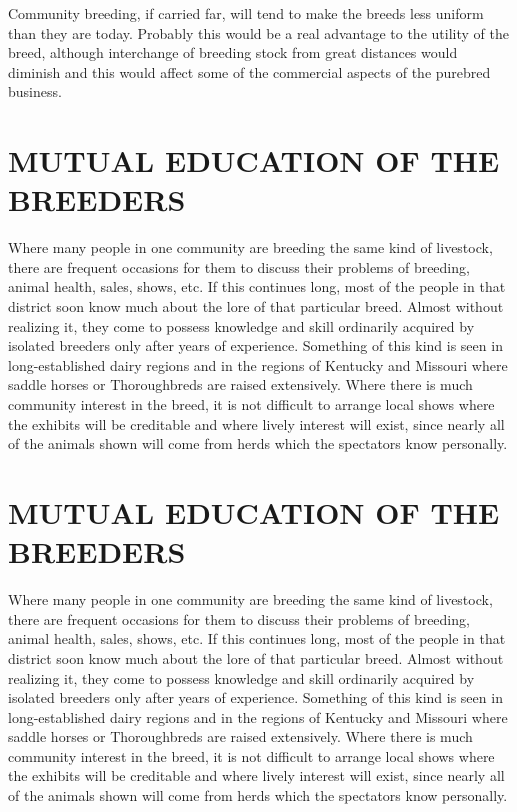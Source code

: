 Community breeding, if carried far, will tend to make the breeds
less uniform than they are today. Probably this would be a real advantage
to the utility of the breed, although interchange of breeding stock
from great distances would diminish and this would affect some of the
commercial aspects of the purebred business.

\section*{MUTUAL EDUCATION OF THE BREEDERS}
Where many people in one community are breeding the same kind
of livestock, there are frequent occasions for them to discuss their problems
of breeding, animal health, sales, shows, etc. If this continues long,
most of the people in that district soon know much about the lore of
that particular breed. Almost without realizing it, they come to possess
knowledge and skill ordinarily acquired by isolated breeders only after
years of experience. Something of this kind is seen in long-established
dairy regions and in the regions of Kentucky and Missouri where saddle
horses or Thoroughbreds are raised extensively. Where there is
much community interest in the breed, it is not difficult to arrange local
shows where the exhibits will be creditable and where lively interest
will exist, since nearly all of the animals shown will come from herds
which the spectators know personally.

\section*{MUTUAL EDUCATION OF THE BREEDERS}
Where many people in one community are breeding the same kind
of livestock, there are frequent occasions for them to discuss their problems
of breeding, animal health, sales, shows, etc. If this continues long,
most of the people in that district soon know much about the lore of
that particular breed. Almost without realizing it, they come to possess
knowledge and skill ordinarily acquired by isolated breeders only after
years of experience. Something of this kind is seen in long-established
dairy regions and in the regions of Kentucky and Missouri where saddle
horses or Thoroughbreds are raised extensively. Where there is
much community interest in the breed, it is not difficult to arrange local
shows where the exhibits will be creditable and where lively interest
will exist, since nearly all of the animals shown will come from herds
which the spectators know personally.

